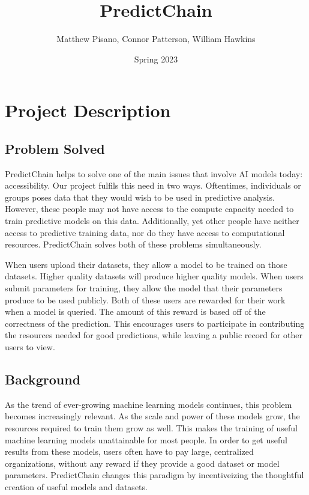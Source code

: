 \documentclass{article}
\title{PredictChain}
\author{Matthew Pisano, Connor Patterson, William Hawkins}
\date{Spring 2023}
\begin{document}
    \maketitle

    \section{Project Description}

    \subsection{Problem Solved}

    PredictChain helps to solve one of the main issues that involve AI models today: accessibility.  Our project fulfils this
    need in two ways.  Oftentimes, individuals or groups poses data that they would wish to be used in predictive analysis.
    However, these people may not have access to the compute capacity needed to train predictive models on this data.  Additionally,
    yet other people have neither access to predictive training data, nor do they have access to computational resources.
    PredictChain solves both of these problems simultaneously.

    When users upload their datasets, they allow a model to be trained on those datasets.  Higher quality datasets will produce
    higher quality models.  When users submit parameters for training, they allow the model that their parameters produce to
    be used publicly.  Both of these users are rewarded for their work when a model is queried.  The amount of this reward
    is based off of the correctness of the prediction.  This encourages users to participate in contributing the
    resources needed for good predictions, while leaving a public record for other users to view.

    \subsection{Background}

    As the trend of ever-growing machine learning models continues, this problem becomes increasingly relevant.
    As the scale and power of these models grow, the resources required to train them grow as well.  This makes the training
    of useful machine learning models unattainable for most people.  In order to get useful results from these models,
    users often have to pay large, centralized organizations, without any reward if they provide a good dataset or model
    parameters.  PredictChain changes this paradigm by incentiveizing the thoughtful creation of useful models and
    datasets.
\end{document}
